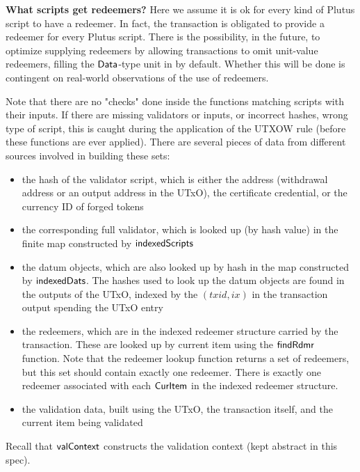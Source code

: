 \textbf{What scripts get redeemers?}
Here we assume it is ok for every kind of Plutus script to
have a redeemer. In fact, the transaction is obligated to provide a redeemer for
every Plutus script. There is the possibility, in the future, to optimize supplying redeemers
by allowing transactions to omit unit-value redeemers, filling the $\mathsf{Data}$-type
unit in by default. Whether this will be done is contingent on real-world
observations of the use of redeemers.

Note that there are no "checks" done inside the functions matching
scripts with their inputs. If there are
missing validators or inputs, or incorrect hashes, wrong type of script,
this is caught during the application of the UTXOW
rule (before these functions are ever applied).
There are several pieces of data from different sources involved in building these
sets:

\begin{itemize}
\item the hash of the validator script, which is either the address (withdrawal
address or an output address in the UTxO),
the certificate credential, or the currency ID of forged tokens

\item the corresponding
full validator, which is looked up (by hash value) in the finite map
constructed by $\mathsf{indexedScripts}$

\item the datum objects, which are also looked up by hash in the map
constructed by $\mathsf{indexedDats}$.
The hashes used to look up the datum objects are found in the outputs of the UTxO,
indexed by the $(txid,ix)$ in the transaction output spending the UTxO entry

\item the redeemers, which are in the indexed redeemer structure carried by the transaction.
These are looked up by current item using the $\mathsf{findRdmr}$ function. Note that
the redeemer lookup function returns a set of redeemers, but this set should
contain exactly one redeemer. There is exactly one redeemer associated with each
$\mathsf{CurItem}$ in the indexed redeemer structure.

\item the validation data, built using the UTxO, the transaction itself,
and the current item being validated
\end{itemize}

Recall that $\mathsf{valContext}$ constructs the validation context (kept abstract
in this spec).

